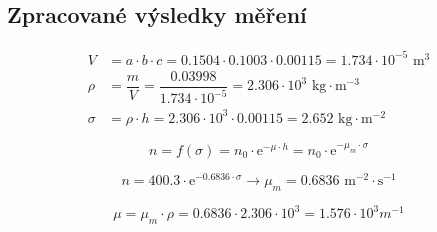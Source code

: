 \documentclass[fleqn]{protokol}
\newcommand{\neweq}{\\[0.8ex]}
\begin{document}
    
    \subsection{Zpracované výsledky měření}


        \begin{align*}
            V &= a \cdot b \cdot c = 0.1504 \cdot 0.1003 \cdot 0.00115 = 1.734 \cdot 10^{-5} \text{ m}^3 \neweq
            \rho &= \dfrac{m}{V} = \dfrac{0.03998}{1.734 \cdot 10^{-5}} = 2.306 \cdot 10^3 \text{ kg$\cdot$m$^{-3}$} \neweq
            \sigma &= \rho \cdot h = 2.306 \cdot 10^3 \cdot 0.00115 = 2.652  \text{ kg$\cdot$m$^{-2}$}
        \end{align*}

        \begin{equation}
            n = f(\sigma) = n_0 \cdot \text{e}^{{ -\mu \cdot h}} = n_0 \cdot \text{e}^{ -\mu_m  \cdot \sigma}
        \end{equation}

        \begin{equation*}
            n = 400.3 \cdot \text{e}^{-0.6836 \cdot \sigma} \rightarrow \boxed{\mu_m = 0.6836 \text{ m$^{-2} \cdot$s$^{-1}$}}
        \end{equation*}

        \begin{equation*}
            \mu = \mu_m \cdot \rho = 0.6836 \cdot 2.306 \cdot 10^{3} = 1.576 \cdot 10^3 m^{-1}
        \end{equation*}
\end{document}
